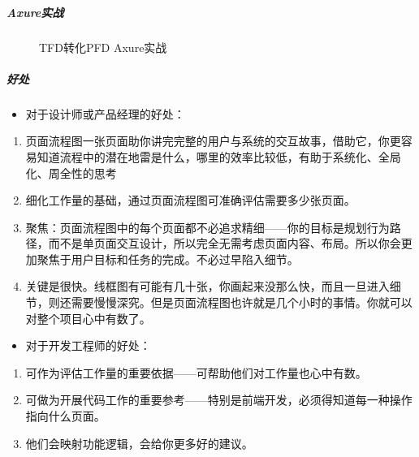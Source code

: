 \documentclass[letterpaper,10pt,english]{sphinxmanual}
\begin{document}
\subparagraph{Axure实战}
\label{\detokenize{chapter_knowledge/flow_chart:id10}}
\begin{figure}[H]
\centering
\capstart

\noindent{}
\caption{TFD转化PFD Axure实战}\label{\detokenize{chapter_knowledge/flow_chart:id42}}\label{\detokenize{chapter_knowledge/flow_chart:flow-chart2page-axure}}\end{figure}


\subparagraph{好处}
\label{\detokenize{chapter_knowledge/flow_chart:id11}}\begin{itemize}
\item {} 
对于设计师或产品经理的好处：

\end{itemize}
\begin{enumerate}
%
\item {} 
页面流程图一张页面助你讲完完整的用户与系统的交互故事，借助它，你更容易知道流程中的潜在地雷是什么，哪里的效率比较低，有助于系统化、全局化、周全性的思考

\item {} 
细化工作量的基础，通过页面流程图可准确评估需要多少张页面。

\item {} 
聚焦：页面流程图中的每个页面都不必追求精细——你的目标是规划行为路径，而不是单页面交互设计，所以完全无需考虑页面内容、布局。所以你会更加聚焦于用户目标和任务的完成。不必过早陷入细节。

\item {} 
关键是很快。线框图有可能有几十张，你画起来没那么快，而且一旦进入细节，则还需要慢慢深究。但是页面流程图也许就是几个小时的事情。你就可以对整个项目心中有数了。

\end{enumerate}
\begin{itemize}
\item {} 
对于开发工程师的好处：

\end{itemize}
\begin{enumerate}
%
\item {} 
可作为评估工作量的重要依据——可帮助他们对工作量也心中有数。

\item {} 
可做为开展代码工作的重要参考——特别是前端开发，必须得知道每一种操作指向什么页面。

\item {} 
他们会映射功能逻辑，会给你更多好的建议。

\end{enumerate}
\end{document}

